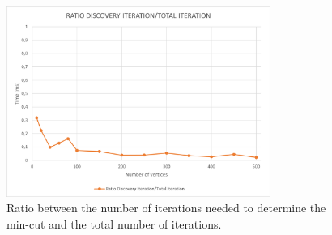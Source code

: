 \begin{figure}[H]
	\centering
	\includegraphics[width=0.77\textwidth]{./img/RatioTotalDiscoveryIteration}
	\caption{Ratio between the number of iterations needed to determine the min-cut and the total number of iterations.}
	\label{fig:kargerComparisonIteration}
\end{figure}
\noindent
\pagebreak
